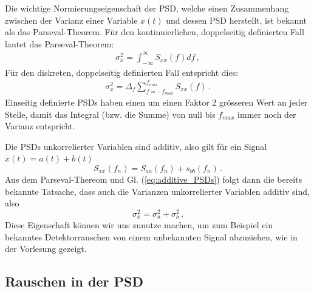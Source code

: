 Die wichtige Normierungseigenschaft der PSD, welche einen Zusammenhang zwischen der Varianz einer Variable $x(t)$ und dessen PSD herstellt, ist bekannt als das Parseval-Theorem. F\"ur 
den kontinuierlichen, doppelseitig definierten Fall lautet das Parseval-Theorem:
\begin{align}
\sigma_x^2 = \int_{- \infty}^\infty S_{xx} (f) df\,,
\label{eq:vl7-8}
\end{align}
F\"ur den diskreten, doppelseitig definierten Fall entspricht dies:
\begin{align}
\sigma_x^2 = \Delta_f \sum_{f = -f_{max}}^{f_{max}} S_{xx} (f)\,.
\label{eq:vl7-9}
\end{align}
Einseitig definierte PSDs haben einen um einen Faktor 2 grösseren Wert an jeder Stelle, damit das Integral (bzw. die Summe) von null bis $f_{max}$ immer noch der Varianz entspricht.

Die PSDs unkorrelierter Variablen sind additiv, also gilt für ein Signal $x(t) = a(t) + b(t)$
\begin{equation}
        S_{xx}(f_n) = S_{aa}(f_n) + s_{bb}(f_n) \,.\label{eq:additive_PSDs}
\end{equation}
Aus dem Parseval-Thereom und Gl. (\ref{eq:additive_PSDs}) folgt dann die bereits bekannte Tatsache, dass auch die Varianzen unkorrelierter Variablen additiv sind, also 
\begin{equation}
    \sigma_x^2 = \sigma_a^2 + \sigma_b^2\,.
\end{equation}
Diese Eigenschaft können wir uns zunutze machen, um zum Beispiel ein bekanntes Detektorrauschen von einem unbekannten Signal abzuziehen, wie in der Vorlesung gezeigt. 

\subsection{Rauschen in der PSD}
\label{subsec:vl10}



